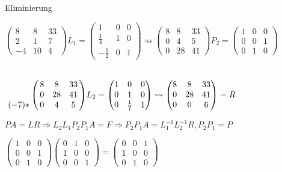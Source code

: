 \documentclass[12pt,a4paper]{article} %
\begin{document}
	Eliminierung
	
	$\begin{pmatrix}
		8 & 8 & 33 \\
		2 & 1 & 7 \\
		-4 & 10 & 4
	\end{pmatrix}
	L_1 = \begin{pmatrix}
		1 & 0 & 0 \\
		\frac{1}{4} & 1 & 0 \\
		-\frac{1}{2} & 0 & 1
	\end{pmatrix}
	\rightsquigarrow
	\begin{pmatrix}
		8 & 8 & 33 \\
		0 & 4 & 5 \\
		0 & 28 & 41
	\end{pmatrix}
	P_2 = \begin{pmatrix}
		1 & 0 & 0 \\
		0 & 0 & 1 \\
		0 & 1 & 0
	\end{pmatrix}$
	
	$\bordermatrix{ ~ & & & \cr
		& 8 & 8 & 33 \cr
		& 0 & 28 & 41 \cr
		(-7) * & 0 & 4 & 5
	}
	L_2 = \begin{pmatrix}
	1 & 0 & 0 \\
	0 & 1 & 0 \\
	0 & \frac{1}{7} & 1
	\end{pmatrix}
	\rightsquigarrow
	\begin{pmatrix}
		8 & 8 & 33 \\
		0 & 28 & 41 \\
		0 & 0 & 6
	\end{pmatrix}
	 = R$
	
	$PA = LR \Rightarrow L_2L_1 P_2P_1 A = F \Rightarrow P_2P_1A = L_1^{-1}L_2^{-1}R, P_2P_1 = P$
	
	$\begin{pmatrix}
		1 & 0 & 0 \\
		0 & 0 & 1 \\
		0 & 1 & 0
	\end{pmatrix}
	\begin{pmatrix}
		0 & 1 & 0 \\
		1 & 0 & 0 \\
		0 & 0 & 1
	\end{pmatrix}
	=
	\begin{pmatrix}
		0 & 0 & 1 \\
		1 & 0 & 0 \\
		0 & 1 & 0
	\end{pmatrix}$
	
\end{document}
